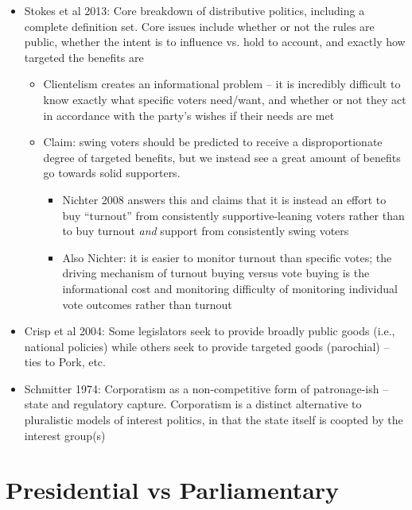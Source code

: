 \documentclass[12pt]{article}
\begin{document}
\begin{itemize}
    \item Stokes et al 2013: Core breakdown of distributive politics, including a complete definition set. Core issues include whether or not the rules are public, whether the intent is to influence vs. hold to account, and exactly how targeted the benefits are
    \begin{itemize}
        \item Clientelism creates an informational problem -- it is incredibly difficult to know exactly what specific voters need/want, and whether or not they act in accordance with the party's wishes if their needs are met
        \item Claim: swing voters should be predicted to receive a disproportionate degree of targeted benefits, but we instead see a great amount of benefits go towards solid supporters.
        \begin{itemize}
            \item Nichter 2008 answers this and claims that it is instead an effort to buy ``turnout'' from consistently supportive-leaning voters rather than to buy turnout \emph{and} support from consistently swing voters
            \item Also Nichter: it is easier to monitor turnout than specific votes; the driving mechanism of turnout buying versus vote buying is the informational cost and monitoring difficulty of monitoring individual vote outcomes rather than turnout
        \end{itemize}
    \end{itemize}
    \item Crisp et al 2004: Some legislators seek to provide broadly public goods (i.e., national policies) while others seek to provide targeted goods (parochial) -- ties to Pork, etc.
    \item Schmitter 1974: Corporatism as a non-competitive form of patronage-ish -- state and regulatory capture. Corporatism is a distinct alternative to pluralistic models of interest politics, in that the state itself is coopted by the interest group(s)
\end{itemize}






\section*{Presidential vs Parliamentary}
\end{document}
